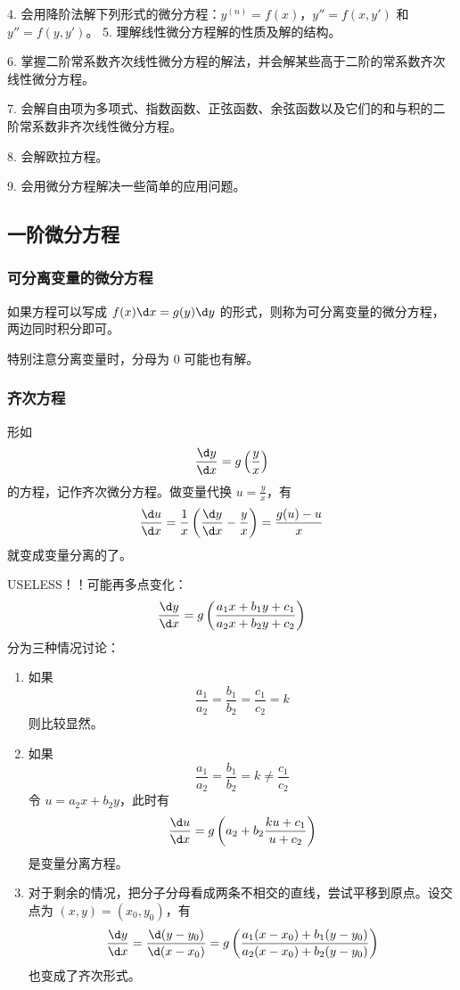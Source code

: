 4. 会用降阶法解下列形式的微分方程：$y^{(n)} = f(x)$，$y''= f(x,y')$ 和 $y''= f(y,y')$。
5. 理解线性微分方程解的性质及解的结构。

6. 掌握二阶常系数齐次线性微分方程的解法，并会解某些高于二阶的常系数齐次线性微分方程。

7. 会解自由项为多项式、指数函数、正弦函数、余弦函数以及它们的和与积的二阶常系数非齐次线性微分方程。

8. 会解欧拉方程。

9. 会用微分方程解决一些简单的应用问题。

\subsection{一阶微分方程}

\subsubsection*{可分离变量的微分方程}

如果方程可以写成 $f(x) \d x = g(y) \d y$ 的形式，则称为可分离变量的微分方程，两边同时积分即可。

\begin{note}
	特别注意分离变量时，分母为 $0$ 可能也有解。
\end{note}

\subsubsection*{齐次方程}

形如
\[ \frac{\d y}{\d x} = g\left(\frac{y}{x}\right) \]
的方程，记作齐次微分方程。做变量代换 $u = \frac{y}{x}$，有
\[ \frac{\d u}{\d x} = \frac{1}{x} \left(\frac{\d y}{\d x} -\frac{y}{x} \right) = \frac{g(u) - u}{x} \]
就变成变量分离的了。

USELESS！！可能再多点变化：
\[ \frac{\d y}{\d x} = g \left(\frac{a_1 x + b_1 y + c_1}{a_2 x + b_2 y + c_2}\right) \]
分为三种情况讨论：
\begin{enumerate}
	\item 如果
	      \[ \frac{a_1}{a_2} = \frac{b_1}{b_2} = \frac{c_1}{c_2} = k \]
	      则比较显然。
	\item 如果
	      \[ \frac{a_1}{a_2} = \frac{b_1}{b_2} = k \neq \frac{c_1}{c_2} \]
	      令 $u = a_2 x + b_2 y$，此时有
	      \[ \frac{\d u}{\d x} = g \left(a_2 + b_2 \frac{k u + c_1}{u + c_2}\right) \]
	      是变量分离方程。
	\item 对于剩余的情况，把分子分母看成两条不相交的直线，尝试平移到原点。设交点为 $(x, y) = (x_0, y_0)$，有
	      \[ \frac{\d y}{\d x} = \frac{\d (y - y_0)}{\d (x - x_0)} = g \left(\frac{a_1 (x - x_0) + b_1 (y - y_0)}{a_2(x - x_0) + b_2 (y - y_0)} \right) \]
	      也变成了齐次形式。
\end{enumerate}

